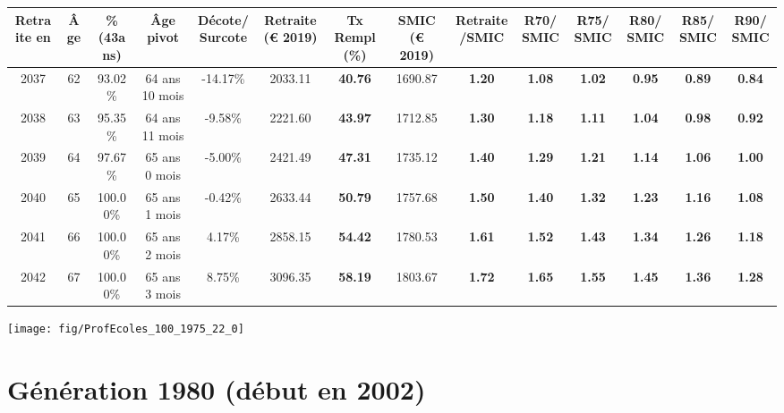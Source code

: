 \begin{adjustbox}{max width=\textwidth} 
\begin{tabular}[htb]{|c|c||c|c|c||c|c||c|c||c|c|c|c|c|} 
\hline 
 Retraite en &  Âge &  \%(43ans) &  Âge pivot &  Décote/Surcote &  Retraite (\euro{} 2019) &  Tx Rempl(\%) &  SMIC (\euro{} 2019) &  Retraite/SMIC &  R70/SMIC &  R75/SMIC &  R80/SMIC &  R85/SMIC &  R90/SMIC \\ 
\hline \hline 
 2037 &  62 &  93.02\% &  64 ans 10 mois &  -14.17\% &  2033.11 &  {\bf 40.76} &  1690.87 &  {\bf 1.20} &  {\bf 1.08} &  {\bf 1.02} &  {\bf {\color{red} 0.95}} &  {\bf {\color{red} 0.89}} &  {\bf {\color{red} 0.84}} \\ 
\hline 
 2038 &  63 &  95.35\% &  64 ans 11 mois &  -9.58\% &  2221.60 &  {\bf 43.97} &  1712.85 &  {\bf 1.30} &  {\bf 1.18} &  {\bf 1.11} &  {\bf 1.04} &  {\bf {\color{red} 0.98}} &  {\bf {\color{red} 0.92}} \\ 
\hline 
 2039 &  64 &  97.67\% &  65 ans 0 mois &  -5.00\% &  2421.49 &  {\bf 47.31} &  1735.12 &  {\bf 1.40} &  {\bf 1.29} &  {\bf 1.21} &  {\bf 1.14} &  {\bf 1.06} &  {\bf {\color{red} 1.00}} \\ 
\hline 
 2040 &  65 &  100.00\% &  65 ans 1 mois &  -0.42\% &  2633.44 &  {\bf 50.79} &  1757.68 &  {\bf 1.50} &  {\bf 1.40} &  {\bf 1.32} &  {\bf 1.23} &  {\bf 1.16} &  {\bf 1.08} \\ 
\hline 
 2041 &  66 &  100.00\% &  65 ans 2 mois &  4.17\% &  2858.15 &  {\bf 54.42} &  1780.53 &  {\bf 1.61} &  {\bf 1.52} &  {\bf 1.43} &  {\bf 1.34} &  {\bf 1.26} &  {\bf 1.18} \\ 
\hline 
 2042 &  67 &  100.00\% &  65 ans 3 mois &  8.75\% &  3096.35 &  {\bf 58.19} &  1803.67 &  {\bf 1.72} &  {\bf 1.65} &  {\bf 1.55} &  {\bf 1.45} &  {\bf 1.36} &  {\bf 1.28} \\ 
\hline 
\hline 
\end{tabular} 
\end{adjustbox} 
 
 \vspace{0.1cm} 

 {\hspace{-2.2cm}\texttt{[image: fig/ProfEcoles\_100\_1975\_22\_0]}} 

\newpage 
 
\section{Génération 1980 (début en 2002)\label{ProfEcoles_100_1980_22_0}} 
 
